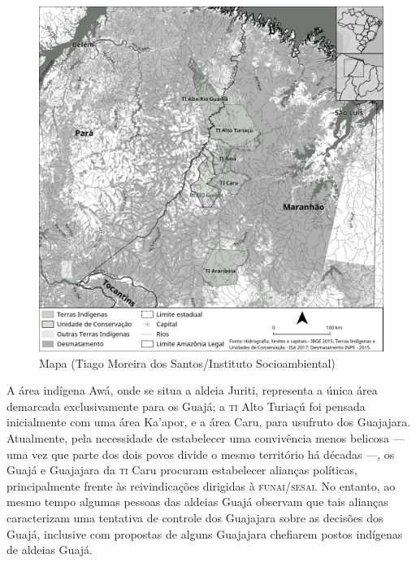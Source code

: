 \begin{figure}[H]
\centering
  \includegraphics[width=\textwidth]{./imgs/mapa_livro_uira}
\caption{Mapa (Tiago Moreira dos Santos/Instituto Socioambiental)}
\end{figure}



A área indígena Awá, onde se situa a aldeia Juriti, representa a única
área demarcada exclusivamente para os Guajá; a \textsc{ti} Alto Turiaçú foi
pensada inicialmente com uma área Ka'apor, e a área Caru, para usufruto
dos Guajajara. Atualmente, pela necessidade de estabelecer uma
convivência menos belicosa --- uma vez que parte dos dois povos divide o
mesmo território há décadas ---, os Guajá e Guajajara da \textsc{ti} Caru procuram
estabelecer alianças políticas, principalmente frente às reivindicações
dirigidas à \textsc{funai}/\textsc{sesai}. No entanto, ao mesmo tempo algumas pessoas das
aldeias Guajá observam que tais alianças caracterizam uma tentativa de
controle dos Guajajara sobre as decisões dos Guajá, inclusive com
propostas de alguns Guajajara chefiarem postos indígenas de aldeias
Guajá.

